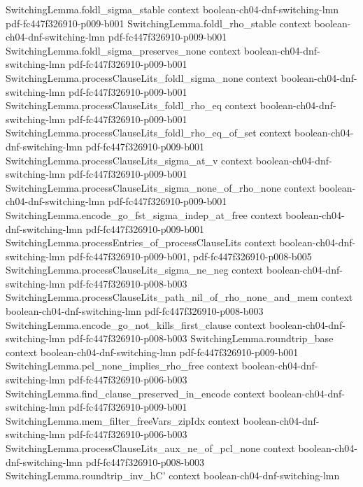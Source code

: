 \begin{lemma}
\proofstep
  {SwitchingLemma.foldl_sigma_stable}
  {context}
  {boolean-ch04-dnf-switching-lmn}
  {pdf-fc447f326910-p009-b001}
\proofstep
  {SwitchingLemma.foldl_rho_stable}
  {context}
  {boolean-ch04-dnf-switching-lmn}
  {pdf-fc447f326910-p009-b001}
\proofstep
  {SwitchingLemma.foldl_sigma_preserves_none}
  {context}
  {boolean-ch04-dnf-switching-lmn}
  {pdf-fc447f326910-p009-b001}
\proofstep
  {SwitchingLemma.processClauseLits_foldl_sigma_none}
  {context}
  {boolean-ch04-dnf-switching-lmn}
  {pdf-fc447f326910-p009-b001}
\proofstep
  {SwitchingLemma.processClauseLits_foldl_rho_eq}
  {context}
  {boolean-ch04-dnf-switching-lmn}
  {pdf-fc447f326910-p009-b001}
\proofstep
  {SwitchingLemma.processClauseLits_foldl_rho_eq_of_set}
  {context}
  {boolean-ch04-dnf-switching-lmn}
  {pdf-fc447f326910-p009-b001}
\proofstep
  {SwitchingLemma.processClauseLits_sigma_at_v}
  {context}
  {boolean-ch04-dnf-switching-lmn}
  {pdf-fc447f326910-p009-b001}
\proofstep
  {SwitchingLemma.processClauseLits_sigma_none_of_rho_none}
  {context}
  {boolean-ch04-dnf-switching-lmn}
  {pdf-fc447f326910-p009-b001}
\proofstep
  {SwitchingLemma.encode_go_fst_sigma_indep_at_free}
  {context}
  {boolean-ch04-dnf-switching-lmn}
  {pdf-fc447f326910-p009-b001}
\proofstep
  {SwitchingLemma.processEntries_of_processClauseLits}
  {context}
  {boolean-ch04-dnf-switching-lmn}
  {pdf-fc447f326910-p009-b001,
    pdf-fc447f326910-p008-b005}
\proofstep
  {SwitchingLemma.processClauseLits_sigma_ne_neg}
  {context}
  {boolean-ch04-dnf-switching-lmn}
  {pdf-fc447f326910-p008-b003}
\proofstep
  {SwitchingLemma.processClauseLits_path_nil_of_rho_none_and_mem}
  {context}
  {boolean-ch04-dnf-switching-lmn}
  {pdf-fc447f326910-p008-b003}
\proofstep
  {SwitchingLemma.encode_go_not_kills_first_clause}
  {context}
  {boolean-ch04-dnf-switching-lmn}
  {pdf-fc447f326910-p008-b003}
\proofstep
  {SwitchingLemma.roundtrip_base}
  {context}
  {boolean-ch04-dnf-switching-lmn}
  {pdf-fc447f326910-p009-b001}
\proofstep
  {SwitchingLemma.pcl_none_implies_rho_free}
  {context}
  {boolean-ch04-dnf-switching-lmn}
  {pdf-fc447f326910-p006-b003}
\proofstep
  {SwitchingLemma.find_clause_preserved_in_encode}
  {context}
  {boolean-ch04-dnf-switching-lmn}
  {pdf-fc447f326910-p009-b001}
\proofstep
  {SwitchingLemma.mem_filter_freeVars_zipIdx}
  {context}
  {boolean-ch04-dnf-switching-lmn}
  {pdf-fc447f326910-p006-b003}
\proofstep
  {SwitchingLemma.processClauseLits_aux_ne_of_pcl_none}
  {context}
  {boolean-ch04-dnf-switching-lmn}
  {pdf-fc447f326910-p008-b003}
\proofstep
  {SwitchingLemma.roundtrip_inv_hC'}
  {context}
  {boolean-ch04-dnf-switching-lmn}

\end{lemma}
